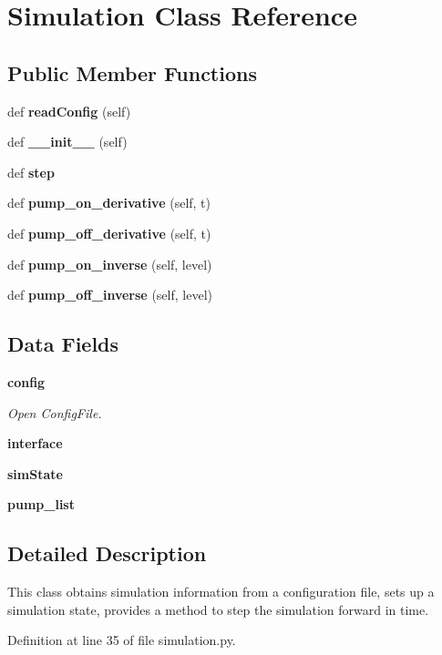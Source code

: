 \section{Simulation Class Reference}
\label{classsims_1_1rtuwater_1_1simulation_1_1_simulation}
\subsection*{Public Member Functions}
\begin{DoxyCompactItemize}
\item 
def {\bf read\+Config} (self)
\item 
def {\bf \+\_\+\+\_\+init\+\_\+\+\_\+} (self)
\item 
def {\bf step}
\item 
def {\bf pump\+\_\+on\+\_\+derivative} (self, t)
\item 
def {\bf pump\+\_\+off\+\_\+derivative} (self, t)
\item 
def {\bf pump\+\_\+on\+\_\+inverse} (self, level)
\item 
def {\bf pump\+\_\+off\+\_\+inverse} (self, level)
\end{DoxyCompactItemize}
\subsection*{Data Fields}
\begin{DoxyCompactItemize}
\item 
{\bf config}
\begin{DoxyCompactList}\small\item\em Open Config\+File. \end{DoxyCompactList}\item 
{\bf interface}
\item 
{\bf sim\+State}
\item 
{\bf pump\+\_\+list}
\end{DoxyCompactItemize}


\subsection{Detailed Description}
\begin{DoxyVerb}This class obtains simulation information from a configuration file,
    sets up a simulation state, provides a method to step the simulation
    forward in time.\end{DoxyVerb}
 

Definition at line 35 of file simulation.\+py.




